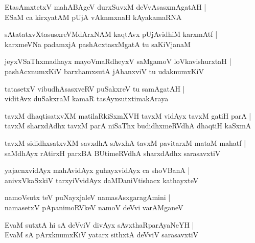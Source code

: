 \begin{shloka}
EtasAmxtetxV mahABAgeV durxSuvxM deVvAsasxmAgatAH |\\
ESaM ca kirxyatAM pUjA vAknmxnaH kAyakamaRNA
\end{shloka}

\begin{shloka}
sAtatatxvXtasusxreVMdArxNAM kaqtAvx pUjAvidhiM karxmAtf |\\
karxmeVNa padamxjA pashAcxtasxMgatA tu saKiVjanaM
\end{shloka}

\begin{shloka}
jeyxVSaThxmadhayx mayoVmaRdheyxV saMgamoV loVkavishurxtaH |\\
pashAcxnumxKiV barxhamxsutA jAhanxviV tu udaknumxKiV
\end{shloka}

\begin{shloka}
tatasetxV vibudhAsasxveRV puSakxreV tu samAgatAH |\\
viditAvx duSakxraM kamaR tasAyxsutxtimakAraya\R
\end{shloka}

\begin{shloka}
tavxM dhaqtisatxvXM matilaRkiSxmXVH tavxM vidAyx tavxM gatiH parA |\\
tavxM sharxdAdhx tavxM parA niSaThx budidhxmeRVdhA dhaqtiH kaSxmA
\end{shloka}

\begin{shloka}
tavxM sididhxsatxvXM savxdhA sAvxhA tavxM pavitarxM mataM mahatf |\\
saMdhAyx rAtirxH parxBA BUtimeRVdhA sharxdAdhx sarasavxtiV
\end{shloka}

\begin{shloka}
yajacnxvidAyx mahAvidAyx guhayxvidAyx ca shoVBanA |\\
anivxVkaSxkiV tarxyiVvidAyx daMDaniVtishacx kathayxteV 
\end{shloka}

\begin{shloka}
namoVsutx teV puNayxjaleV namasAsxgaragAmini |\\
namasetxV pApanimoRVkeV namoV deVvi varAMganeV
\end{shloka}

\begin{shloka}
EvaM sutxtA hi sA deVviV divAyx sAvxthaRparAyaNeYH |\\
EvaM sA pArxknumxKiV yatarx sithxtA deVviV sarasavxtiV 
\end{shloka}

